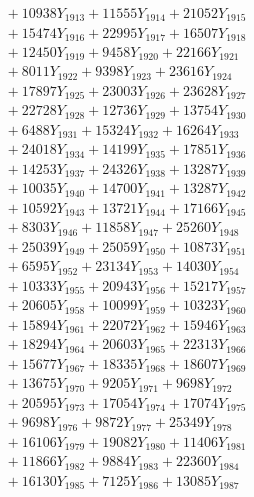 \documentclass[a4paper,10pt]{article}
\begin{document}
{\begin{align}
&\;  + 10938 Y_{1913} + 11555 Y_{1914} + 21052 Y_{1915} \\[0.3ex]
&\;  + 15474 Y_{1916} + 22995 Y_{1917} + 16507 Y_{1918} \\[0.5ex]\allowbreak
&\;  + 12450 Y_{1919} + 9458 Y_{1920} + 22166 Y_{1921} \\[0.3ex]
&\;  + 8011 Y_{1922} + 9398 Y_{1923} + 23616 Y_{1924} \\[0.3ex]
&\;  + 17897 Y_{1925} + 23003 Y_{1926} + 23628 Y_{1927} \\[0.3ex]
&\;  + 22728 Y_{1928} + 12736 Y_{1929} + 13754 Y_{1930} \\[0.3ex]
&\;  + 6488 Y_{1931} + 15324 Y_{1932} + 16264 Y_{1933} \\[0.3ex]
&\;  + 24018 Y_{1934} + 14199 Y_{1935} + 17851 Y_{1936} \\[0.3ex]
&\;  + 14253 Y_{1937} + 24326 Y_{1938} + 13287 Y_{1939} \\[0.3ex]
&\;  + 10035 Y_{1940} + 14700 Y_{1941} + 13287 Y_{1942} \\[0.3ex]
&\;  + 10592 Y_{1943} + 13721 Y_{1944} + 17166 Y_{1945} \\[0.3ex]
&\;  + 8303 Y_{1946} + 11858 Y_{1947} + 25260 Y_{1948} \\[0.5ex]\allowbreak
&\;  + 25039 Y_{1949} + 25059 Y_{1950} + 10873 Y_{1951} \\[0.3ex]
&\;  + 6595 Y_{1952} + 23134 Y_{1953} + 14030 Y_{1954} \\[0.3ex]
&\;  + 10333 Y_{1955} + 20943 Y_{1956} + 15217 Y_{1957} \\[0.3ex]
&\;  + 20605 Y_{1958} + 10099 Y_{1959} + 10323 Y_{1960} \\[0.3ex]
&\;  + 15894 Y_{1961} + 22072 Y_{1962} + 15946 Y_{1963} \\[0.3ex]
&\;  + 18294 Y_{1964} + 20603 Y_{1965} + 22313 Y_{1966} \\[0.3ex]
&\;  + 15677 Y_{1967} + 18335 Y_{1968} + 18607 Y_{1969} \\[0.3ex]
&\;  + 13675 Y_{1970} + 9205 Y_{1971} + 9698 Y_{1972} \\[0.3ex]
&\;  + 20595 Y_{1973} + 17054 Y_{1974} + 17074 Y_{1975} \\[0.3ex]
&\;  + 9698 Y_{1976} + 9872 Y_{1977} + 25349 Y_{1978} \\[0.5ex]\allowbreak
&\;  + 16106 Y_{1979} + 19082 Y_{1980} + 11406 Y_{1981} \\[0.3ex]
&\;  + 11866 Y_{1982} + 9884 Y_{1983} + 22360 Y_{1984} \\[0.3ex]
&\;  + 16130 Y_{1985} + 7125 Y_{1986} + 13085 Y_{1987} \\[0.3ex]

\end{align}}
\end{document}

